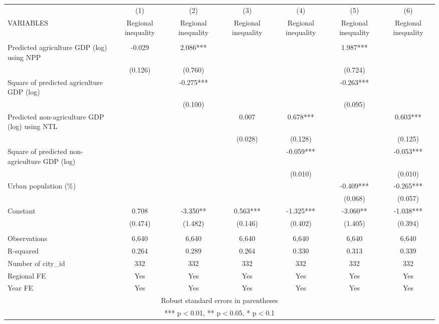\documentclass[]{article}
\begin{document}
\begin{tabular}{lcccccc} \hline
 & (1) & (2) & (3) & (4) & (5) & (6) \\
VARIABLES & Regional inequality & Regional inequality & Regional inequality & Regional inequality & Regional inequality & Regional inequality \\ \hline
 &  &  &  &  &  &  \\
Predicted agriculture GDP (log) using NPP & -0.029 & 2.086*** &  &  & 1.987*** &  \\
 & (0.126) & (0.760) &  &  & (0.724) &  \\
Square of predicted agriculture GDP (log) &  & -0.275*** &  &  & -0.263*** &  \\
 &  & (0.100) &  &  & (0.095) &  \\
Predicted non-agriculture GDP (log) using NTL &  &  & 0.007 & 0.678*** &  & 0.603*** \\
 &  &  & (0.028) & (0.128) &  & (0.125) \\
Square of predicted non-agriculture GDP (log) &  &  &  & -0.059*** &  & -0.053*** \\
 &  &  &  & (0.010) &  & (0.010) \\
Urban population (\%) &  &  &  &  & -0.409*** & -0.265*** \\
 &  &  &  &  & (0.068) & (0.057) \\
Constant & 0.708 & -3.350** & 0.563*** & -1.325*** & -3.060** & -1.038*** \\
 & (0.474) & (1.482) & (0.146) & (0.402) & (1.405) & (0.394) \\
 &  &  &  &  &  &  \\
Observations & 6,640 & 6,640 & 6,640 & 6,640 & 6,640 & 6,640 \\
R-squared & 0.264 & 0.289 & 0.264 & 0.330 & 0.313 & 0.339 \\
Number of city\_id & 332 & 332 & 332 & 332 & 332 & 332 \\
Regional FE & Yes & Yes & Yes & Yes & Yes & Yes \\
 Year FE & Yes & Yes & Yes & Yes & Yes & Yes \\ \hline
\multicolumn{7}{c}{ Robust standard errors in parentheses} \\
\multicolumn{7}{c}{ *** p$<$0.01, ** p$<$0.05, * p$<$0.1} \\
\end{tabular}
\end{document}
